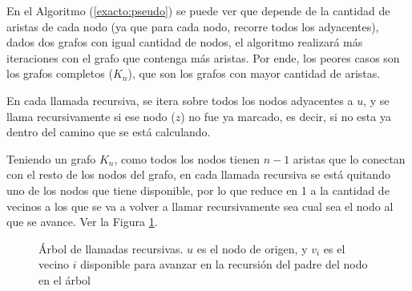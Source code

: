En el Algoritmo (\ref{exacto:pseudo}) se puede ver que depende de la cantidad de aristas de cada nodo (ya que para cada nodo, recorre todos los adyacentes), dados dos grafos
con igual cantidad de nodos, el algoritmo realizar\'a m\'as iteraciones con el grafo que contenga m\'as aristas. Por ende, los peores casos son los grafos completos ($K_n$),
que son los grafos con mayor cantidad de aristas.

En cada llamada recursiva, se itera sobre todos los nodos adyacentes a $u$, y se llama recursivamente si ese nodo ($z$) no fue ya marcado, es decir, si no esta ya dentro del camino que se est\'a calculando.

Teniendo un grafo $K_n$, como todos los nodos tienen $n - 1$ aristas que lo conectan con el resto de los nodos del grafo, en cada llamada recursiva se est\'a quitando uno de los nodos que tiene disponible, por lo que reduce en 1 a la cantidad de vecinos a los que se va a volver a llamar recursivamente sea cual sea el nodo al que se avance. Ver la Figura \ref{exacto:arbol_llamadas}.

\begin{figure}[htbp]
\centering
{}

\caption{\'Arbol de llamadas recursivas. $u$ es el nodo de origen, y $v_i$ es el vecino $i$ disponible para avanzar en la recursi\'on del padre del nodo en el \'arbol}
\label{exacto:arbol_llamadas}
\end{figure}

